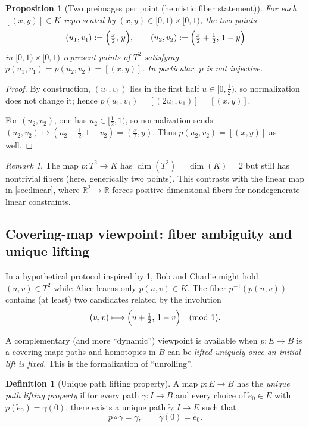 \documentclass[11pt,a4paper]{article}
\newtheorem{proposition}[theorem]{Proposition}
\theoremstyle{definition}
\newtheorem{definition}[theorem]{Definition}
\theoremstyle{remark}
\newtheorem{remark}[theorem]{Remark}
\begin{document}
\begin{proposition}[Two preimages per point (heuristic fiber statement)]
\label{prop:two-preimages}
For each \([ (x,y) ]\in K\) represented by \((x,y)\in[0,1)\times[0,1)\), the two points
\[
(u_1,v_1):=\Bigl(\tfrac{x}{2},\, y\Bigr),\qquad
(u_2,v_2):=\Bigl(\tfrac{x}{2}+\tfrac12,\, 1-y\Bigr)
\]
in \([0,1)\times[0,1)\) represent points of \(T^2\) satisfying \(p(u_1,v_1)=p(u_2,v_2)=[(x,y)]\). In particular, \(p\) is not injective.
\end{proposition}

\begin{proof}
By construction, \((u_1,v_1)\) lies in the first half \(u\in[0,\tfrac12)\), so normalization does not change it; hence \(p(u_1,v_1)=[(2u_1,v_1)]=[(x,y)]\).

For \((u_2,v_2)\), one has \(u_2\in[\tfrac12,1)\), so normalization sends \((u_2,v_2)\mapsto (u_2-\tfrac12,1-v_2)=(\tfrac{x}{2},y)\). Thus \(p(u_2,v_2)=[(x,y)]\) as well.
\end{proof}

\begin{remark}
\label{rem:covering-vs-dimension-drop}
The map \(p:T^2\to K\) has \(\dim(T^2)=\dim(K)=2\) but still has nontrivial fibers (here, generically two points). This contrasts with the linear map in \cref{sec:linear}, where \(\mathbb{R}^2\to\mathbb{R}\) forces positive-dimensional fibers for nondegenerate linear constraints.
\end{remark}

\subsection{Covering-map viewpoint: fiber ambiguity and unique lifting}
\label{sec:hiding-heuristic}

In a hypothetical protocol inspired by \cref{prop:two-preimages}, Bob and Charlie might hold \((u,v)\in T^2\) while Alice learns only \(p(u,v)\in K\). The fiber \(p^{-1}(p(u,v))\) contains (at least) two candidates related by the involution
\[
(u,v)\longmapsto \Bigl(u+\tfrac12,\, 1-v\Bigr)\quad (\mathrm{mod}\ 1).
\]

A complementary (and more ``dynamic'') viewpoint is available when \(p:E\to B\) is a covering map: paths and homotopies in \(B\) can be \emph{lifted uniquely once an initial lift is fixed}. This is the formalization of ``unrolling''.

\begin{definition}[Unique path lifting property]
\label{def:uplp}
A map \(p:E\to B\) has the \emph{unique path lifting property} if for every path \(\gamma:I\to B\) and every choice of \(\tilde e_0\in E\) with \(p(\tilde e_0)=\gamma(0)\), there exists a unique path \(\tilde\gamma:I\to E\) such that
\[
p\circ \tilde\gamma = \gamma,
\qquad
\tilde\gamma(0)=\tilde e_0.
\]
\end{definition}
\end{document}
